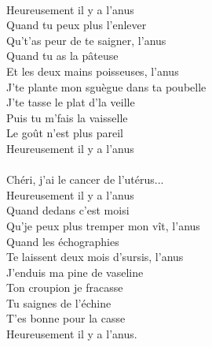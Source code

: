 \\Heureusement il y a l'anus
\\Quand tu peux plus l'enlever
\\Qu't'as peur de te saigner, l'anus
\\Quand tu as la pâteuse
\\Et les deux mains poisseuses, l'anus
\\J'te plante mon sguègue dans ta poubelle
\\J'te tasse le plat d'la veille
\\Puis tu m'fais la vaisselle
\\Le goût n'est plus pareil
\\Heureusement il y a l'anus
\\\\Chéri, j'ai le cancer de l'utérus...
\\Heureusement il y a l'anus
\\Quand dedans c'est moisi
\\Qu'je peux plus tremper mon vît, l'anus
\\Quand les échographies
\\Te laissent deux mois d'sursis, l'anus
\\J'enduis ma pine de vaseline
\\Ton croupion je fracasse
\\Tu saignes de l'échine
\\T'es bonne pour la casse
\\Heureusement il y a l'anus.


\breakpage
